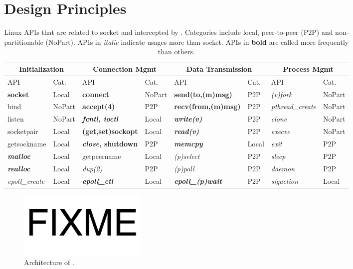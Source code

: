 \section{Design Principles}
\label{sec:architecture}


\begin{table}[t]
	\centering
	\begin{tabular}{ll|ll|ll|ll}
		\hline
		\multicolumn{2}{c|}{Initialization} &
		\multicolumn{2}{c|}{Connection Mgmt} &
		\multicolumn{2}{c|}{Data Transmission} &
		\multicolumn{2}{c}{Process Mgmt} \\
		\hline
		API & Cat. &
		API & Cat. &
		API & Cat. &
		API & Cat. \\
		\hline
		\hline
		\textbf{socket} & Local &
		\textbf{connect} & NoPart &
		\textbf{send(to,(m)msg)} & P2P &
		\textit{(v)fork} & NoPart \\
		\hline
		bind & NoPart &
		\textbf{accept(4)} & P2P &
		\textbf{recv(from,(m)msg)} & P2P &
		\textit{pthread\_create} & NoPart \\
		\hline
		listen & NoPart &
		\textbf{\textit{fcntl, ioctl}} & Local &
		\textbf{\textit{write(v)}} & P2P &
		\textit{clone} & NoPart \\
		\hline
		socketpair & Local &
		\textbf{(get,set)sockopt} & Local &
		\textbf{\textit{read(v)}} & P2P &
		\textit{execve} & NoPart \\
		\hline
		getsockname  & Local &
		\textbf{\textit{close}, shutdown} & P2P &
		\textbf{\textit{memcpy}} & Local &
		\textit{exit} & P2P \\
		\hline
		\textbf{\textit{malloc}} & Local &
		getpeername & Local &
		\textit{(p)select} & P2P &
		\textit{sleep} & P2P \\
		\hline
		\textbf{\textit{realloc}} & Local &
		\textit{dup(2)} & P2P &
		\textit{(p)poll} & P2P &
		\textit{daemon} & P2P \\
		\hline
		\textit{epoll\_create} & Local &
		\textbf{\textit{epoll\_ctl}} & Local &
		\textbf{\textit{epoll\_(p)wait}} & P2P &
		\textit{sigaction} & Local \\
		\hline
	\end{tabular}
	\caption{Linux APIs that are related to socket and intercepted by \libipc{}. Categories include local, peer-to-peer (P2P) and non-partitionable (NoPart). APIs in \textit{italic} indicate usages more than socket. APIs in \textbf{bold} are called more frequently than others.}
	\label{tab:socket-api}
\end{table}

\begin{figure}[t]
	\centering
	\includegraphics[width=0.3\textwidth]{images/fixme}
	\caption{Architecture of \sys{}.}
	\label{fig:architecture}
\end{figure}


